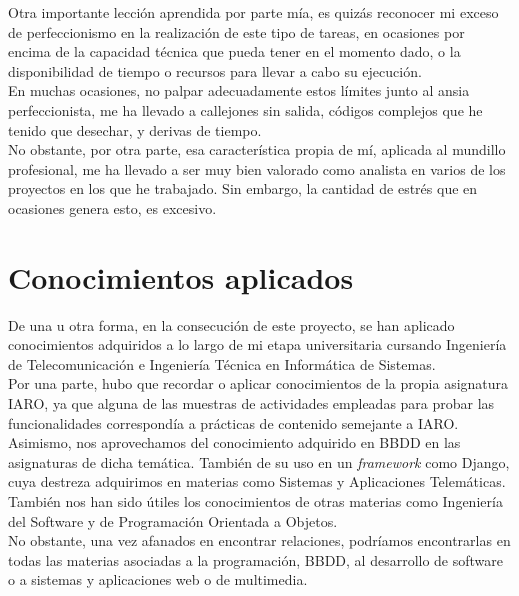Otra importante lección aprendida por parte mía, es quizás reconocer mi exceso de perfeccionismo en la realización de este tipo de tareas, en ocasiones por encima de la capacidad técnica que pueda tener en el momento dado, o la disponibilidad de tiempo o recursos para llevar a cabo su ejecución.\\


En muchas ocasiones, no palpar adecuadamente estos límites junto al ansia perfeccionista, me ha llevado a callejones sin salida, códigos complejos que he tenido que desechar, y derivas de tiempo.\\


No obstante, por otra parte, esa característica propia de mí, aplicada al mundillo profesional, me ha llevado a ser muy bien valorado como analista en varios de los proyectos en los que he trabajado. Sin embargo, la cantidad de estrés que en ocasiones genera esto, es excesivo.\\

\newpage
\section{Conocimientos aplicados}

De una u otra forma, en la consecución de este proyecto, se han aplicado conocimientos adquiridos a lo largo de mi etapa universitaria cursando Ingeniería de Telecomunicación e Ingeniería Técnica en Informática de Sistemas.\\


Por una parte, hubo que recordar o aplicar conocimientos de la propia asignatura IARO, ya que alguna de las muestras de actividades empleadas para probar las funcionalidades correspondía a prácticas de contenido semejante a IARO.\\


Asimismo, nos aprovechamos del conocimiento adquirido en BBDD en las asignaturas de dicha temática. También de su uso en un \textit{framework} como Django, cuya destreza adquirimos en materias como Sistemas y Aplicaciones Telemáticas.\\


También nos han sido útiles los conocimientos de otras materias como Ingeniería del Software y de Programación Orientada a Objetos.\\


No obstante, una vez afanados en encontrar relaciones, podríamos encontrarlas en todas las materias asociadas a la programación, BBDD, al desarrollo de software o a sistemas y aplicaciones web o de multimedia.\\

